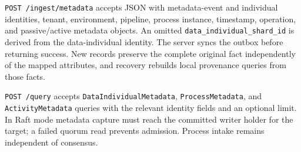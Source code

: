 \texttt{POST /ingest/metadata} accepts JSON with metadata-event and
individual identities, tenant, environment, pipeline, process instance,
timestamp, operation, and passive/active metadata objects. An omitted
\texttt{data\_individual\_shard\_id} is derived from the data-individual identity.
The server syncs the outbox before returning success. New records preserve the
complete original fact independently of the mapped attributes, and recovery
rebuilds local provenance queries from those facts.

\texttt{POST /query} accepts \texttt{DataIndividualMetadata},
\texttt{ProcessMetadata}, and \texttt{ActivityMetadata} queries with the relevant
identity fields and an optional limit. In Raft mode metadata capture must reach
the committed writer holder for the target; a failed quorum read prevents
admission. Process intake remains independent of consensus.
